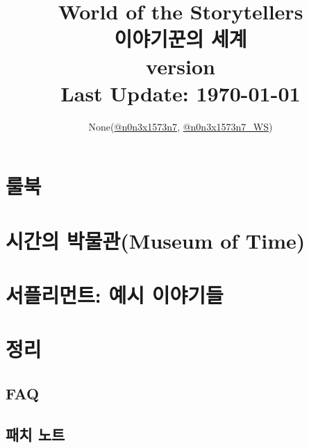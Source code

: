 \documentclass[12pt]{report}
\title{
	World of the Storytellers\\
	이야기꾼의 세계\\
	\large version \version\\
	Last Update: \today
	\ifDLC{\\ \textcolor{red}{DLC ENABLED}}\fi
}
\author{None(\href{https://www.twitter.com/n0n3x1573n7}{@n0n3x1573n7}, \href{https://www.twitter.com/n0n3x1573n7_WS}{@n0n3x1573n7\_WS})}
\date{}
\begin{document}
	\maketitle

	\vspace*{\fill}
	{\doclicenseThis}
	
	\setcounter{tocdepth}{-1}
	
\iffalse
	\chapter*{서론}
		
\fi
	
	\tableofcontents
	
	\part{룰북}
		
	
	\part{시간의 박물관(Museum of Time)}
		
	
	\part{서플리먼트: 예시 이야기들} \label{endof_MoT}
		
	
	\part{정리}
		\chapter*{FAQ}
			
		
		\chapter*{패치 노트}
			
		
			\printindex
	
	\vspace*{\fill}
	{\doclicenseThis}
	
\end{document}
